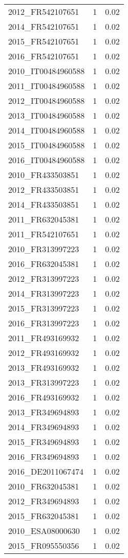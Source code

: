 \begin{table*}[htbp]
\begin{tabular}{lrr}
2012_FR542107651 & 1 & 0.02 \\
2014_FR542107651 & 1 & 0.02 \\
2015_FR542107651 & 1 & 0.02 \\
2016_FR542107651 & 1 & 0.02 \\
2010_IT00484960588 & 1 & 0.02 \\
2011_IT00484960588 & 1 & 0.02 \\
2012_IT00484960588 & 1 & 0.02 \\
2013_IT00484960588 & 1 & 0.02 \\
2014_IT00484960588 & 1 & 0.02 \\
2015_IT00484960588 & 1 & 0.02 \\
2016_IT00484960588 & 1 & 0.02 \\
2010_FR433503851 & 1 & 0.02 \\
2012_FR433503851 & 1 & 0.02 \\
2014_FR433503851 & 1 & 0.02 \\
2011_FR632045381 & 1 & 0.02 \\
2011_FR542107651 & 1 & 0.02 \\
2010_FR313997223 & 1 & 0.02 \\
2016_FR632045381 & 1 & 0.02 \\
2012_FR313997223 & 1 & 0.02 \\
2014_FR313997223 & 1 & 0.02 \\
2015_FR313997223 & 1 & 0.02 \\
2016_FR313997223 & 1 & 0.02 \\
2011_FR493169932 & 1 & 0.02 \\
2012_FR493169932 & 1 & 0.02 \\
2013_FR493169932 & 1 & 0.02 \\
2013_FR313997223 & 1 & 0.02 \\
2016_FR493169932 & 1 & 0.02 \\
2013_FR349694893 & 1 & 0.02 \\
2014_FR349694893 & 1 & 0.02 \\
2015_FR349694893 & 1 & 0.02 \\
2016_FR349694893 & 1 & 0.02 \\
2016_DE2011067474 & 1 & 0.02 \\
2010_FR632045381 & 1 & 0.02 \\
2012_FR349694893 & 1 & 0.02 \\
2015_FR632045381 & 1 & 0.02 \\
2010_ESA08000630 & 1 & 0.02 \\
2015_FR095550356 & 1 & 0.02 \\

\end{tabular}
\end{table*}
